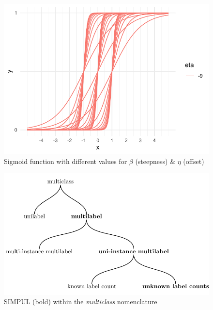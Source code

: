 




\begin{figure}[htbp]
\centering
\includegraphics[width=.9\linewidth]{./images/sigmoid.pdf}
\caption{\label{fig:sigmoid}
Sigmoid function with different values for $\beta$ (steepness) \& $\eta$ (offset)}
\end{figure}


\begin{figure}[t]
\centering
\includegraphics[width=.9\linewidth]{./tree/Tree.pdf}
\caption{\label{fig:tree}
SIMPUL (bold) within the \emph{multiclass} nomenclature
}
\end{figure}

